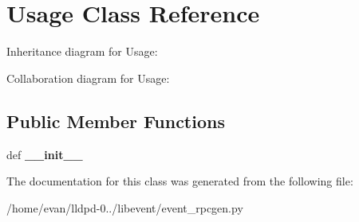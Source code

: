 \section{\-Usage \-Class \-Reference}
\label{classevent__rpcgen_1_1_usage}


\-Inheritance diagram for \-Usage\-:


\-Collaboration diagram for \-Usage\-:
\subsection*{\-Public \-Member \-Functions}
\begin{DoxyCompactItemize}
\item 
def {\bfseries \-\_\-\-\_\-init\-\_\-\-\_\-}\label{classevent__rpcgen_1_1_usage_ac775ee34451fdfa742b318538164070e}

\end{DoxyCompactItemize}


\-The documentation for this class was generated from the following file\-:\begin{DoxyCompactItemize}
\item 
/home/evan/lldpd-\/0../libevent/event\-\_\-rpcgen.\-py\end{DoxyCompactItemize}
